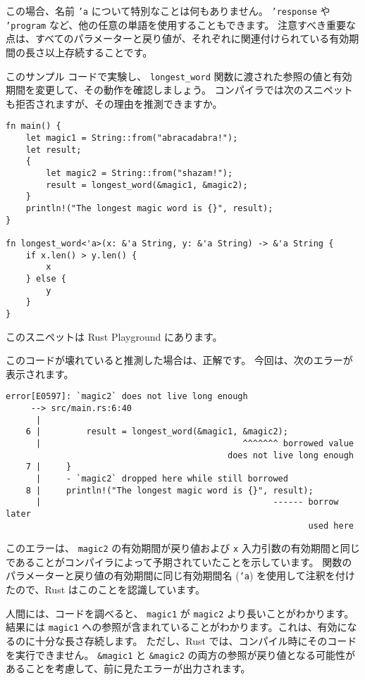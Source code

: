 この場合、名前 \texttt{'a} について特別なことは何もありません。 \texttt{'response} や \texttt{'program} など、他の任意の単語を使用することもできます。 注意すべき重要な点は、すべてのパラメーターと戻り値が、それぞれに関連付けられている有効期間の長さ以上存続することです。

このサンプル コードで実験し、 \texttt{longest\_word} 関数に渡された参照の値と有効期間を変更して、その動作を確認しましょう。 コンパイラでは次のスニペットも拒否されますが、その理由を推測できますか。

\begin{lstlisting}[numbers=none]
fn main() {
    let magic1 = String::from("abracadabra!");
    let result;
    {
        let magic2 = String::from("shazam!");
        result = longest_word(&magic1, &magic2);
    }
    println!("The longest magic word is {}", result);
}

fn longest_word<'a>(x: &'a String, y: &'a String) -> &'a String {
    if x.len() > y.len() {
        x
    } else {
        y
    }
}
\end{lstlisting}

このスニペットは Rust Playground にあります。

このコードが壊れていると推測した場合は、正解です。 今回は、次のエラーが表示されます。

\begin{lstlisting}[numbers=none]
    error[E0597]: `magic2` does not live long enough
     --> src/main.rs:6:40
      |
    6 |         result = longest_word(&magic1, &magic2);
      |                                        ^^^^^^^ borrowed value
                                            does not live long enough
    7 |     }
      |     - `magic2` dropped here while still borrowed
    8 |     println!("The longest magic word is {}", result);
      |                                              ------ borrow later
                                                            used here
\end{lstlisting}

このエラーは、 \texttt{magic2} の有効期間が戻り値および \texttt{x} 入力引数の有効期間と同じであることがコンパイラによって予期されていたことを示しています。 関数のパラメーターと戻り値の有効期間に同じ有効期間名 (\texttt{'a}) を使用して注釈を付けたので、Rust はこのことを認識しています。

人間には、コードを調べると、 \texttt{magic1} が \texttt{magic2} より長いことがわかります。 結果には \texttt{magic1} への参照が含まれていることがわかります。これは、有効になるのに十分な長さ存続します。 ただし、Rust では、コンパイル時にそのコードを実行できません。 \texttt{\&magic1} と \texttt{\&magic2} の両方の参照が戻り値となる可能性があることを考慮して、前に見たエラーが出力されます。


